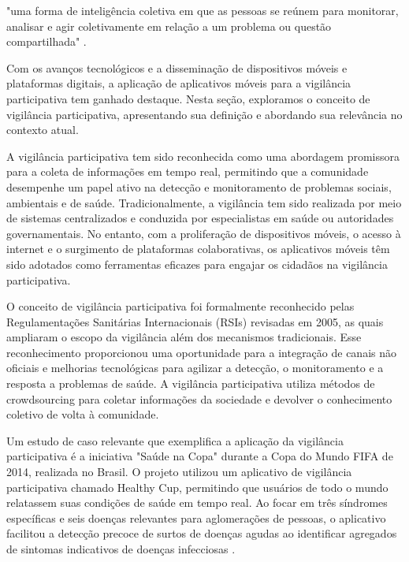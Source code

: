 \begin{citacao}
	"uma forma de inteligência coletiva em que as pessoas se reúnem para monitorar, analisar e agir coletivamente em relação a um problema ou questão compartilhada" \cite[p. 1]{2011_Bryer}.
\end{citacao}

Com os avanços tecnológicos e a disseminação de dispositivos móveis e plataformas digitais, a aplicação de aplicativos móveis para a vigilância participativa tem ganhado destaque. Nesta seção, exploramos o conceito de vigilância participativa, apresentando sua definição e abordando sua relevância no contexto atual.

A vigilância participativa tem sido reconhecida como uma abordagem promissora para a coleta de informações em tempo real, permitindo que a comunidade desempenhe um papel ativo na detecção e monitoramento de problemas sociais, ambientais e de saúde. Tradicionalmente, a vigilância tem sido realizada por meio de sistemas centralizados e conduzida por especialistas em saúde ou autoridades governamentais. No entanto, com a proliferação de dispositivos móveis, o acesso à internet e o surgimento de plataformas colaborativas, os aplicativos móveis têm sido adotados como ferramentas eficazes para engajar os cidadãos na vigilância participativa.

O conceito de vigilância participativa foi formalmente reconhecido pelas Regulamentações Sanitárias Internacionais (RSIs) revisadas em 2005, as quais ampliaram o escopo da vigilância além dos mecanismos tradicionais. Esse reconhecimento proporcionou uma oportunidade para a integração de canais não oficiais e melhorias tecnológicas para agilizar a detecção, o monitoramento e a resposta a problemas de saúde. A vigilância participativa utiliza métodos de crowdsourcing para coletar informações da sociedade e devolver o conhecimento coletivo de volta à comunidade.\cite[1]{2017_Smolinski}

Um estudo de caso relevante que exemplifica a aplicação da vigilância participativa é a iniciativa "Saúde na Copa" durante a Copa do Mundo FIFA de 2014, realizada no Brasil. O projeto utilizou um aplicativo de vigilância participativa chamado Healthy Cup, permitindo que usuários de todo o mundo relatassem suas condições de saúde em tempo real. Ao focar em três síndromes específicas e seis doenças relevantes para aglomerações de pessoas, o aplicativo facilitou a detecção precoce de surtos de doenças agudas ao identificar agregados de sintomas indicativos de doenças infecciosas \cite{2017_LealNeto}.

